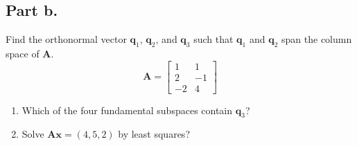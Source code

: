 \subsection{Part b.}
Find the orthonormal vector $\mathbf{q}_{1}$, $\mathbf{q}_{2}$, and 
$\mathbf{q}_{3}$ such that $\mathbf{q}_{1}$ and $\mathbf{q}_{2}$ span the
column space of $\mathbf{A}$.
\begin{equation}
    \mathbf{A} =
    \begin{bmatrix}
        1       &       1       \\
        2       &       -1      \\
        -2      &       4       
    \end{bmatrix}
\end{equation}
\begin{enumerate}[label=(\arabic*)]
    \item Which of the four fundamental subspaces contain $\mathbf{q}_{3}$?
    \item Solve $\mathbf{A}\mathbf{x} = (4,5,2)$ by least squares?
\end{enumerate}
